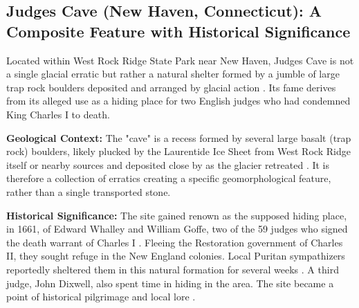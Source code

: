 \documentclass[
11pt, %
english, %
singlespacing, %
headsepline, %
]{MastersDoctoralThesis} %
\begin{document}
\subsection{Judges Cave (New Haven, Connecticut): A Composite Feature with Historical Significance}
\label{subsec:judges_cave}

Located within West Rock Ridge State Park near New Haven, Judges Cave is not a single glacial erratic but rather a natural shelter formed by a jumble of large trap rock boulders deposited and arranged by glacial action \cite{Dana1891, Stiles1794}. Its fame derives from its alleged use as a hiding place for two English judges who had condemned King Charles I to death.

\textbf{Geological Context:} The "cave" is a recess formed by several large basalt (trap rock) boulders, likely plucked by the Laurentide Ice Sheet from West Rock Ridge itself or nearby sources and deposited close by as the glacier retreated \cite{Dana1891, Rice1906}. It is therefore a collection of erratics creating a specific geomorphological feature, rather than a single transported stone.

\textbf{Historical Significance:} The site gained renown as the supposed hiding place, in 1661, of Edward Whalley and William Goffe, two of the 59 judges who signed the death warrant of Charles I \cite{Stiles1794, onlyinyourstateLearnFascinating}. Fleeing the Restoration government of Charles II, they sought refuge in the New England colonies. Local Puritan sympathizers reportedly sheltered them in this natural formation for several weeks \cite{Stiles1794}. A third judge, John Dixwell, also spent time in hiding in the area. The site became a point of historical pilgrimage and local lore \cite{onlyinyourstateLearnFascinating}.
\end{document}
